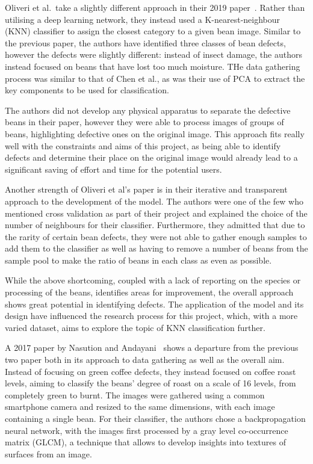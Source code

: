 Oliveri et al.\  take a slightly different approach in their 2019 paper~\cite{hyperspectralGreenOliveri}.
Rather than utilising a deep learning network, they instead used a K-nearest-neighbour
(KNN) classifier to assign the closest category to a given bean image.
Similar
to the previous paper, the authors have identified three classes of bean defects,
however the defects were slightly different: instead of insect damage, the
authors instead focused on beans that have lost too much moisture.
THe data gathering
process was similar to that of Chen et al., as was their use of PCA to extract the
key components to be used for classification.

The authors did not develop any physical apparatus to separate the defective beans
in their paper, however they were able to process images of groups of beans, highlighting
defective ones on the original image.
This approach fits really well with the
constraints and aims of this project, as being able to identify defects and determine
their place on the original image would already lead to a significant saving of effort
and time for the potential users.

Another strength of Oliveri et al's paper is in their iterative and transparent approach
to the development of the model.
The authors were one of the few who mentioned
cross validation as part of their project and explained the choice of the number
of neighbours for their classifier.
Furthermore, they admitted that due to the
rarity of certain bean defects, they were not able to gather enough samples to add
them to the classifier as well as having to remove a number of beans from the sample
pool to make the ratio of beans in each class as even as possible.

While the above shortcoming, coupled with a lack of reporting on the species or
processing of the beans, identifies areas for improvement, the overall approach
shows great potential in identifying defects.
The application of the model and its
design have influenced the research process for this project, which, with a more
varied dataset, aims to explore the topic of KNN classification further.

A 2017 paper by Nasution and Andayani~\cite{manyRoastLevelsNasution} shows a
departure from the previous two paper both in its approach to data gathering as
well as the overall aim.
Instead of focusing on green coffee defects, they
instead focused on coffee roast levels, aiming to classify the beans' degree of
roast on a scale of 16 levels, from completely green to burnt.
The images were
gathered using a common smartphone camera and resized to the same dimensions, with
each image containing a single bean.
For their classifier, the authors chose a backpropagation
neural network, with the images first processed by a gray level co-occurrence
matrix (GLCM), a technique that allows to develop insights into textures of surfaces
from an image.

